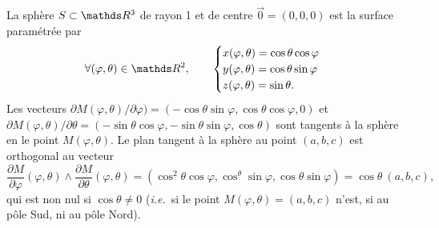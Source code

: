 \begin{exm}
	La sphère $S \subset \R^3$ de rayon 1 et de centre $\vec{0} = (0,0,0)$ est la surface paramétrée par \[
		\forall (\varphi,\theta) \in \R^2, \quad\quad \begin{cases}
			x(\varphi,\theta) = \cos \theta \cos \varphi\\
			y(\varphi, \theta) = \cos \theta \sin \varphi\\
			z(\varphi,\theta) = \sin \theta.
		\end{cases}
	\]
	Les vecteurs $\partial M(\varphi, \theta) / \partial \varphi) = (-\cos \theta \sin \varphi,  \cos \theta \cos \varphi, 0)$ et $\partial M(\varphi,\theta) / \partial \theta = (-\sin \theta \cos \varphi, -\sin \theta \sin \varphi, \cos \theta)$ sont tangents à la sphère en le point $M(\varphi, \theta)$.
	Le plan tangent à la sphère au point $(a,b,c)$ est orthogonal au vecteur \[
		\frac{\partial M}{\partial \varphi}(\varphi, \theta) \wedge \frac{\partial M}{\partial \theta}(\varphi,\theta) = (\cos^2 \theta \cos \varphi, \cos^ \theta \sin \varphi, \cos \theta \sin \varphi) = \cos \theta\: (a,b,c),
	\] qui est non nul si $\cos \theta \neq 0$ (\textit{i.e.}\ si le point $M(\varphi,\theta) = (a,b,c)$ n'est, si au pôle Sud, ni au pôle Nord).


\end{exm}
